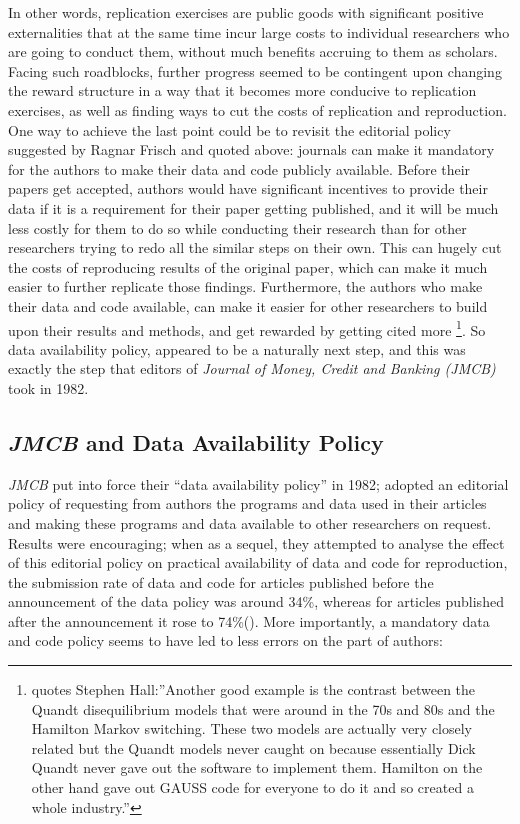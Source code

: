 \documentclass[11pt]{article}
\begin{document}
In other words, replication exercises are public goods with significant positive externalities that at the same time incur large costs to individual researchers who are going to conduct them, without much benefits accruing to them as scholars. Facing such roadblocks, further progress seemed to be contingent upon changing the reward structure in a way that it becomes more conducive to replication exercises, as well as finding ways to cut the costs of replication and reproduction.\\

One way to achieve the last point could be to revisit the editorial policy suggested by Ragnar Frisch and quoted above: journals can make it mandatory for the authors to make their data and code publicly available. Before their papers get accepted, authors would have significant incentives to provide their data if it is a requirement for their paper getting published, and it will be much less costly for them to do so while conducting their research than for other researchers trying to redo all the similar steps on their own. This can hugely cut the costs of reproducing results of the original paper, which can make it much easier to further replicate those findings. Furthermore, the authors who make their data and code available, can make it easier for other researchers to build upon their results and methods, and get rewarded by getting cited more \footnote{\cite{renfro2004econometric} quotes Stephen Hall:''Another good example is the contrast between the Quandt disequilibrium models that
were around in the 70s and 80s and the Hamilton Markov switching. These two models are actually very
closely related but the Quandt models never caught on because essentially Dick Quandt never gave out the
software to implement them. Hamilton on the other hand gave out GAUSS code for everyone to do it and
so created a whole industry.''}. So data availability policy, appeared to be a naturally next step, and this was exactly the step that editors of \textit{Journal of Money, Credit and Banking (JMCB)} took in 1982.

\subsection{\textit{JMCB} and Data Availability Policy}
\textit{JMCB} put into force their  ``data availability policy'' in 1982; adopted an editorial policy of requesting from authors the programs and data used in their articles and making these programs and data available to other researchers on request. Results were encouraging; when as a sequel, they attempted to analyse the effect of this editorial policy on practical availability of data and code for reproduction, the submission rate of data and code for articles published before the announcement of the data policy was around 34\%, whereas for articles published after the announcement it rose to 74\%(\cite{dewald1986replication}). More importantly, a mandatory data and code policy seems to have led to less errors on the part of authors:
\end{document}
